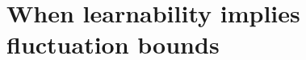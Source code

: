 \documentclass[1p]{elsarticle}
\theoremstyle{plain}
\newtheorem{con}[thm]{Conjecture}
\theoremstyle{definition}
\theoremstyle{remark}
\renewcommand{\epsilon}{\varepsilon}
\theoremstyle{definition}
\begin{document}
{\section{When learnability implies fluctuation bounds}
%

}
\end{document}
